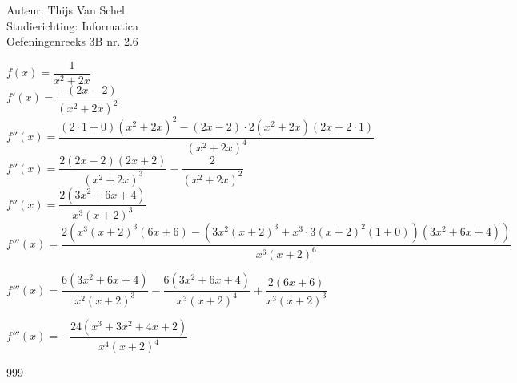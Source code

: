 \documentclass[a4paper]{article}
\begin{document}
  
\noindent \large Auteur: Thijs Van Schel \\
\noindent \large Studierichting: Informatica\\
\noindent \large Oefeningenreeks 3B nr. 2.6\\

\medskip

\normalsize

$f(x) = \dfrac{1}{x^2+2x}$\\

$f'(x) = \dfrac{-(2x-2)}{(x^2+2x)^2}$\\

$f''(x) = \dfrac{(2\cdot1+0)(x^2+2x)^2-(2x-2)\cdot2(x^2+2x)(2x+2\cdot1)}{(x^2+2x)^4}$\\

$f''(x) = \dfrac{2(2x-2)(2x+2)}{(x^2+2x)^3}-\dfrac{2}{(x^2+2x)^2}$\\

$f''(x) = \dfrac{2(3x^2+6x+4)}{x^3(x+2)^3}$\\

$f'''(x) = \dfrac{2(x^3(x+2)^3(6x+6)-(3x^2(x+2)^3+x^3\cdot3(x+2)^2(1+0))(3x^2+6x+4))}{x^6(x+2)^6}$

$f'''(x) = \dfrac{6(3x^2+6x+4)}{x^2(x+2)^3}-\dfrac{6(3x^2+6x+4)}{x^3(x+2)^4}+\dfrac{2(6x+6)}{x^3(x+2)^3}$ 

$f'''(x) = -\dfrac{24(x^3+3x^2+4x+2)}{x^4(x+2)^4}$

\begin{thebibliography}{999}
\end{thebibliography}
\end{document}
